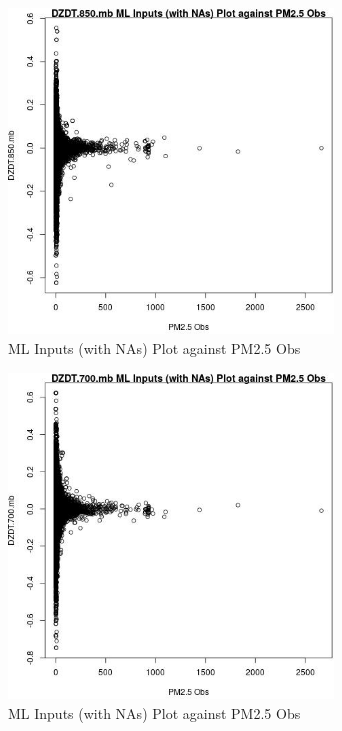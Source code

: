 \begin{figure} 
\centering  
\includegraphics[width=0.77\textwidth]{Code_Outputs/Report_ML_input_PM25_Step4_part_e_de_duplicated_aves_compiled_2019-05-21wNAs_DZDT850mbvPM25_Obs.jpg} 
\caption{\label{fig:Report_ML_input_PM25_Step4_part_e_de_duplicated_aves_compiled_2019-05-21wNAsDZDT850mbvPM25_Obs}ML Inputs (with NAs) Plot against PM2.5 Obs} 
\end{figure} 
 

\begin{figure} 
\centering  
\includegraphics[width=0.77\textwidth]{Code_Outputs/Report_ML_input_PM25_Step4_part_e_de_duplicated_aves_compiled_2019-05-21wNAs_DZDT700mbvPM25_Obs.jpg} 
\caption{\label{fig:Report_ML_input_PM25_Step4_part_e_de_duplicated_aves_compiled_2019-05-21wNAsDZDT700mbvPM25_Obs}ML Inputs (with NAs) Plot against PM2.5 Obs} 
\end{figure} 
 

